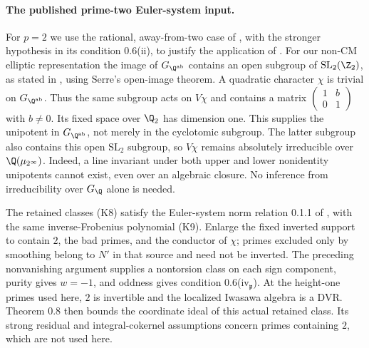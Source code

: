 \paragraph{The published prime-two Euler-system input.}
For $p=2$ we use the rational, away-from-two case of
\cite[Theorem 0.8, pp.~317--318]{kato1999}, with the stronger
hypothesis in its condition 0.6(ii), to justify the application of
\cite[Theorem 13.4(2)]{kato}. For our non-CM elliptic representation
the image of $G_{\Q^{\rm ab}}$ contains an open subgroup of
$\mathrm{SL}_2(\Z_2)$, as stated in
\cite[Example 0.6.2, pp.~317--318]{kato1999}, using Serre's open-image
theorem. A quadratic character $\chi$ is trivial on $G_{\Q^{\rm ab}}$.
Thus the same subgroup acts on $V\chi$ and contains a matrix
$\left(\begin{smallmatrix}1&b\\0&1\end{smallmatrix}\right)$ with
$b\ne0$. Its fixed space over $\Q_2$ has dimension one. This supplies
the unipotent in $G_{\Q^{\rm ab}}$, not merely in the cyclotomic
subgroup. The latter subgroup also contains this open
$\mathrm{SL}_2$ subgroup, so $V\chi$ remains absolutely irreducible
over $\Q(\mu_{2^\infty})$. Indeed, a line invariant under both upper
and lower nonidentity unipotents cannot exist, even over an algebraic
closure. No inference from irreducibility over $G_\Q$ alone is needed.

The retained classes (K8) satisfy the Euler-system norm relation
0.1.1 of \cite{kato1999}, with the same inverse-Frobenius polynomial
(K9). Enlarge the fixed inverted support to contain $2$, the bad
primes, and the conductor of $\chi$; primes excluded only by smoothing
belong to $N'$ in that source and need not be inverted. The preceding
nonvanishing argument supplies a nontorsion class on each sign
component, purity gives $w=-1$, and oddness gives condition
0.6(iv$_{\mathfrak p}$). At the height-one primes used here, $2$ is
invertible and the localized Iwasawa algebra is a DVR. Theorem 0.8
then bounds the coordinate ideal of this actual retained class. Its
strong residual and integral-cokernel assumptions concern primes
containing $2$, which are not used here.

